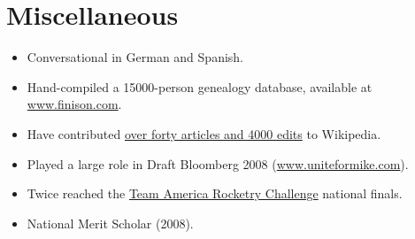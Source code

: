 \documentclass[letterpaper,10pt]{article}
\begin{document}
\section{Miscellaneous}

\begin{itemize}
 \item Conversational in German and Spanish.\vspace{-0.2em}
 \item Hand-compiled a 15000-person genealogy database, available at \href{http://www.finison.com}{www.finison.com}.\normalsize\vspace{-0.2em}
 \item Have contributed \href{http://en.wikipedia.org/wiki/User:Michael_A._White}{over forty articles and 4000 edits} to Wikipedia. \vspace{-0.2em}
 \item Played a large role in Draft Bloomberg 2008 (\href{http://www.uniteformike.com}{www.uniteformike.com}).\vspace{-0.2em}
 \item Twice reached the \href{http://www.rocketcontest.org}{Team America Rocketry Challenge} national finals.\vspace{-0.2em}
 \item National Merit Scholar (2008).\vspace{-0.2em}
 
\end{itemize}


\end{document}
